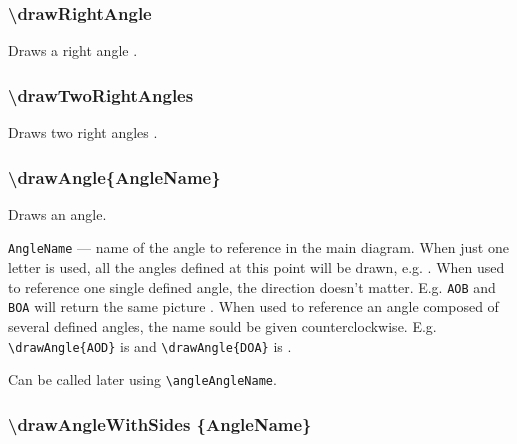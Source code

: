 \documentclass{ltxdoc}
\begin{document}



\subsubsection{\textbackslash drawRightAngle}

	Draws a right angle \drawRightAngle.

\subsubsection{\textbackslash drawTwoRightAngles}

	Draws two right angles \drawTwoRightAngles.


\subsubsection{\textbackslash drawAngle\{AngleName\}}\label{drawAngle}

	Draws an angle.
	

	\texttt{AngleName} — name of the angle to reference in the main diagram. 
	When just one letter is used, all the angles defined at this point will be drawn, e.g. . When used to reference one single defined angle, the direction doesn't matter. 
	E.g. \texttt{AOB} and \texttt{BOA} will return the same picture . 
	When used to reference an angle composed of several defined angles, the name sould be given counterclockwise. 
	E.g. \texttt{\textbackslash drawAngle\{AOD\}} is  and \texttt{\textbackslash drawAngle\{DOA\}} is .
	
	Can be called later using \texttt{\textbackslash angleAngleName}.
	
\subsubsection{\textbackslash drawAngleWithSides \{AngleName\}}
\end{document}
